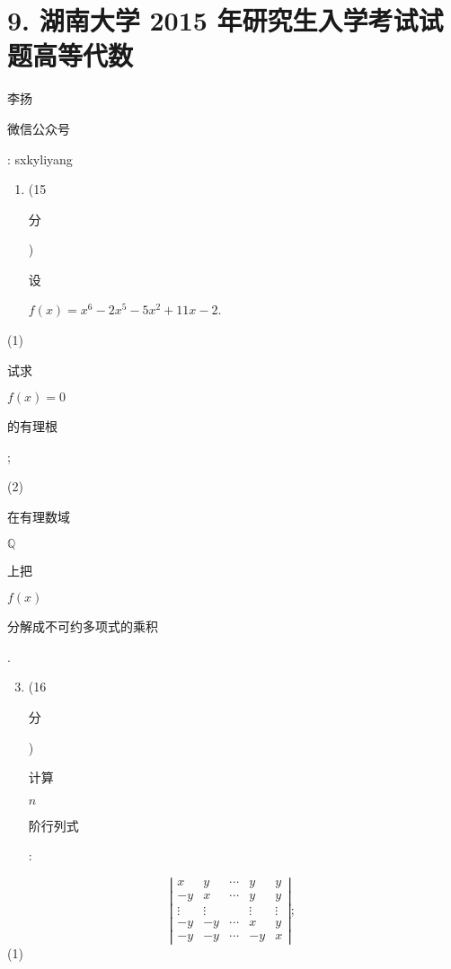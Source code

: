 \documentclass[10pt]{article}
\begin{document}
\section{9. 湖南大学 2015 年研究生入学考试试题高等代数}
\begin{CJK}{UTF8}{mj}李扬\end{CJK}

\begin{CJK}{UTF8}{mj}微信公众号\end{CJK}: sxkyliyang

\begin{enumerate}
  \item (15 \begin{CJK}{UTF8}{mj}分\end{CJK}) \begin{CJK}{UTF8}{mj}设\end{CJK} $f(x)=x^{6}-2 x^{5}-5 x^{2}+11 x-2$.
\end{enumerate}
(1) \begin{CJK}{UTF8}{mj}试求\end{CJK} $f(x)=0$ \begin{CJK}{UTF8}{mj}的有理根\end{CJK};

(2) \begin{CJK}{UTF8}{mj}在有理数域\end{CJK} $\mathbb{Q}$ \begin{CJK}{UTF8}{mj}上把\end{CJK} $f(x)$ \begin{CJK}{UTF8}{mj}分解成不可约多项式的乘积\end{CJK}.

\begin{enumerate}
  \setcounter{enumi}{2}
  \item (16 \begin{CJK}{UTF8}{mj}分\end{CJK}) \begin{CJK}{UTF8}{mj}计算\end{CJK} $n$ \begin{CJK}{UTF8}{mj}阶行列式\end{CJK}:
\end{enumerate}
$$
\left|\begin{array}{ccccc}
x & y & \cdots & y & y \\
-y & x & \cdots & y & y \\
\vdots & \vdots & & \vdots & \vdots \\
-y & -y & \cdots & x & y \\
-y & -y & \cdots & -y & x
\end{array}\right| \text {; }
$$
(1)
\end{document}
